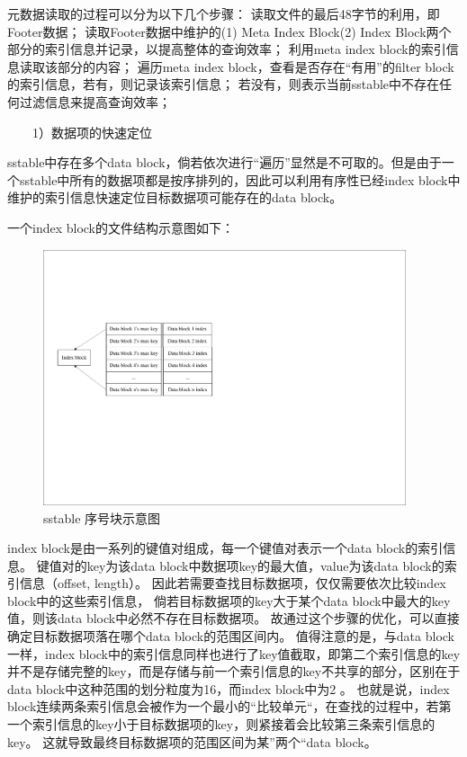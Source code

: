 \begin{enumerate}
\begin{enumerate}
元数据读取的过程可以分为以下几个步骤：
读取文件的最后48字节的利用，即Footer数据；
读取Footer数据中维护的(1) Meta Index Block(2) Index Block两个部分的索引信息并记录，以提高整体的查询效率；
利用meta index block的索引信息读取该部分的内容；
遍历meta index block，查看是否存在“有用”的filter block的索引信息，若有，则记录该索引信息；
若没有，则表示当前sstable中不存在任何过滤信息来提高查询效率；

\ \ \ \ 1）数据项的快速定位 
			
			sstable中存在多个data block，倘若依次进行“遍历”显然是不可取的。但是由于一个sstable中所有的数据项都是按序排列的，因此可以利用有序性已经index block中维护的索引信息快速定位目标数据项可能存在的data block。

一个index block的文件结构示意图如下：

\begin{figure}[H]
	\centering
	\includegraphics[width=0.95\textwidth]{pdf/indexblock.pdf}
	\caption{sstable 序号块示意图}
	\label{sstable_index_block}
\end{figure}

index block是由一系列的键值对组成，每一个键值对表示一个data block的索引信息。
键值对的key为该data block中数据项key的最大值，value为该data block的索引信息（offset, length）。
因此若需要查找目标数据项，仅仅需要依次比较index block中的这些索引信息，
倘若目标数据项的key大于某个data block中最大的key值，则该data block中必然不存在目标数据项。
故通过这个步骤的优化，可以直接确定目标数据项落在哪个data block的范围区间内。
值得注意的是，与data block一样，index block中的索引信息同样也进行了key值截取，即第二个索引信息的key并不是存储完整的key，而是存储与前一个索引信息的key不共享的部分，区别在于data block中这种范围的划分粒度为16，而index block中为2 。
也就是说，index block连续两条索引信息会被作为一个最小的“比较单元“，在查找的过程中，若第一个索引信息的key小于目标数据项的key，则紧接着会比较第三条索引信息的key。
这就导致最终目标数据项的范围区间为某”两个“data block。


\end{enumerate}
\end{enumerate}
